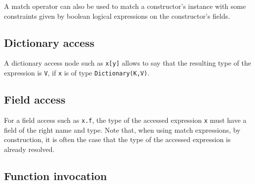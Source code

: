 \documentclass[11pt]{report}
\begin{document}
\begin{center}
  
\DP
\end{center}

A match operator can also be used to match a constructor's instance with some constraints given by boolean logical expressions on the constructor's fields.

\begin{center}
 \RightLabel{$ [ \{ freevars(e_i)=\emptyset \}_{i \in [1..n]} ] $}
\DP
\end{center}

\subsection{Dictionary access}

A dictionary access node such as \texttt{x[y]} allows to say that the resulting type of the expression is \texttt{V}, if \texttt{x} is of type \texttt{Dictionary(K,V)}.

\begin{center}
 
\DP
\end{center}

\subsection{Field access}

For a field access such as \texttt{x.f}, the type of the accessed expression \texttt{x} must have a field of the right name and type. Note that, when using match expressions, by construction, it is often the case that the type of the accessed expression is already resolved.

\begin{center}
\DP
\end{center}

\subsection{Function invocation}
\end{document}
